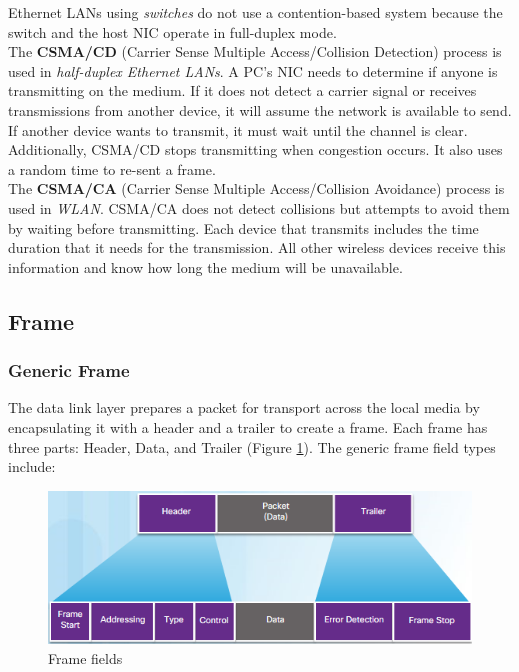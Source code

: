 \note Ethernet LANs using \emph{switches} do not use a contention-based system because the switch and the host NIC operate in full-duplex mode.\\

The \textbf{CSMA/CD} (Carrier Sense Multiple Access/Collision Detection) process is used in \emph{half-duplex Ethernet LANs}. A PC's NIC needs to determine if anyone is transmitting on the medium. If it does not detect a carrier signal or receives transmissions from another device, it will assume the network is available to send. If another device wants to transmit, it must wait until the channel is clear. Additionally, CSMA/CD stops transmitting when congestion occurs. It also uses a random time to re-sent a frame.\\

The \textbf{CSMA/CA} (Carrier Sense Multiple Access/Collision Avoidance) process is used in \emph{WLAN}. CSMA/CA does not detect collisions but attempts to avoid them by waiting before transmitting. Each device that transmits includes the time duration that it needs for the transmission. All other wireless devices receive this information and know how long the medium will be unavailable. 

\subsection{Frame}

\subsubsection{Generic Frame}

The data link layer prepares a packet for transport across the local media by encapsulating it with a header and a trailer to create a frame. Each frame has three parts: Header, Data, and Trailer (Figure \ref{Frame}). The generic frame field types include:

\begin{figure}[hbtp]
\caption{Frame fields}\label{Frame}
\centering
\includegraphics[scale=0.8]{pictures/Frame.PNG}
\end{figure}


